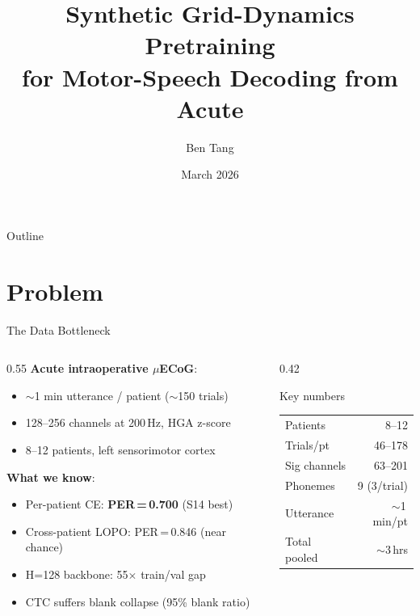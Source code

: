 \documentclass[aspectratio=169, 11pt]{beamer}
\title[Synthetic Pretraining for \mcecog]{%
  Synthetic Grid-Dynamics Pretraining\\for Motor-Speech Decoding from Acute \mcecog}
\author[B.\,Tang]{Ben Tang}
\institute[Cogan Lab]{Cogan Lab, Duke University}
\date{March 2026}
\newcommand{\mcecog}{$\mu$ECoG\xspace}
\newcommand{\perbad}[1]{\textcolor{WarnRed}{#1}}
\begin{document}
\begin{frame}[plain]
  \titlepage
\end{frame}

\begin{frame}{Outline}
  \tableofcontents
\end{frame}

\section{Problem}

\begin{frame}{The Data Bottleneck}

\begin{columns}[T]
\begin{column}{0.55\textwidth}
\textbf{Acute intraoperative \mcecog}:
\begin{itemize}
  \item $\sim$1 min utterance / patient ($\sim$150 trials)
  \item 128--256 channels at 200\,Hz, HGA z-score
  \item 8--12 patients, left sensorimotor cortex
\end{itemize}

\vspace{0.6em}
\textbf{What we know}:
\begin{itemize}
  \item Per-patient CE: \textbf{PER\,=\,0.700} (S14 best)
  \item Cross-patient LOPO: \perbad{PER\,=\,0.846} (near chance)
  \item H=128 backbone: \perbad{55$\times$ train/val gap}
  \item CTC suffers blank collapse (\perbad{95\% blank ratio})
\end{itemize}
\end{column}
\begin{column}{0.42\textwidth}
\begin{block}{Key numbers}
\centering
\small
\begin{tabular}{@{}lr@{}}
  \toprule
  Patients    & 8--12 \\
  Trials/pt   & 46--178 \\
  Sig channels & 63--201 \\
  Phonemes    & 9 (3/trial) \\
  Utterance   & $\sim$1\,min/pt \\
  Total pooled & $\sim$3\,hrs \\
  \bottomrule
\end{tabular}
\end{block}


\end{column}
\end{columns}
\end{frame}
\end{document}

